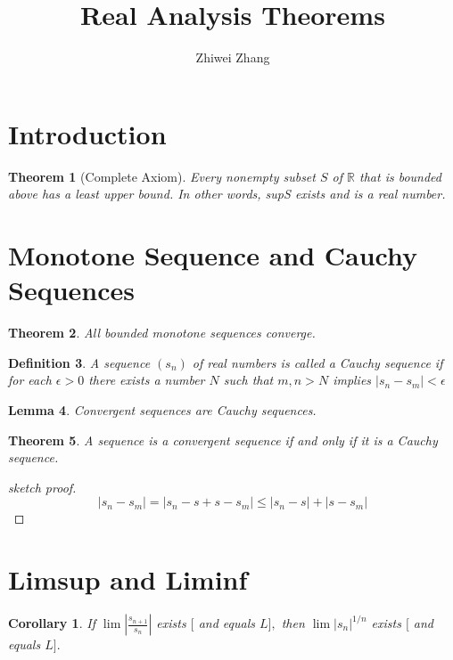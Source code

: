 \documentclass[12pt]{article}
\newtheorem{theorem}{Theorem}[section]
\newtheorem{corollary}{Corollary}[theorem]
\newtheorem{lemma}[theorem]{Lemma}
\newtheorem{definition}[theorem]{Definition}
\begin{document}
 
 
 
\title{Real Analysis Theorems}
\author{Zhiwei Zhang}
 
\maketitle

\section{Introduction}
\begin{theorem}[Complete Axiom]
	Every nonempty subset $S$ of $\mathbb { R }$ that is bounded above has a least upper
	bound. In other words, supS exists and is a real number.
\end{theorem}

\section{Monotone Sequence and Cauchy Sequences}
\begin{theorem}
	All bounded monotone sequences converge.
\end{theorem}
\begin{definition}
	A sequence $\left( s _ { n } \right)$ of real numbers is called a Cauchy sequence if
	for each $\epsilon > 0$ there exists a number $N$ such that
	$m , n > N$ implies $\left| s _ { n } - s _ { m } \right| < \epsilon$
\end{definition}
\begin{lemma}
	Convergent sequences are Cauchy sequences.
\end{lemma}

\begin{theorem}
	A sequence is a convergent sequence if and only if it is a Cauchy sequence.
\end{theorem}
\begin{proof}[sketch proof]$$
	\left| s _ { n } - s _ { m } \right| = \left| s _ { n } - s + s - s _ { m } \right| \leq \left| s _ { n } - s \right| + \left| s - s _ { m } \right|
	$$
\end{proof}
\section{Limsup and Liminf}
\begin{corollary}
	If $\lim \left| \frac { s _ { n + 1 } } { s _ { n } } \right|$ exists $[$ and equals $L ] ,$ then $\lim \left| s _ { n } \right| ^ { 1 / n } $ exists $[$ and
	equals $L ] .$
\end{corollary}
\end{document}
